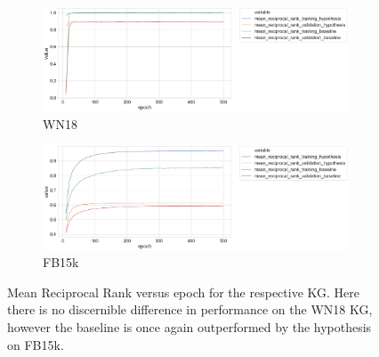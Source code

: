 
\begin{figure}[H]
	\begin{subfigure}[b]{.5\linewidth}
   		\centering
    		\includegraphics[width=1.0\linewidth, height=0.6\linewidth]{WN18_mean_reciprocal_rank_Results}
		\captionsetup{justification=centering}
		\caption{WN18}
	\end{subfigure}
	\begin{subfigure}[b]{.5\linewidth}
   		\centering
		\includegraphics[width=1.0\linewidth, height=0.6\linewidth]{FB15k_mean_reciprocal_rank_Results}
		\captionsetup{justification=centering}
		\caption{FB15k}
	\end{subfigure}
	\captionsetup{justification=centering}
	\caption{Mean Reciprocal Rank versus epoch for the respective KG. Here there is no discernible difference in performance on the WN18 KG, however the baseline is once again outperformed by the hypothesis on FB15k.}
\end{figure}

